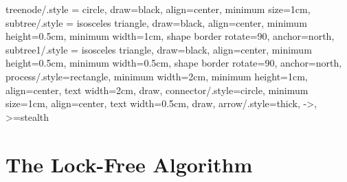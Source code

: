 \begin{limitscope}
\tikzset
{
    treenode/.style = {circle, draw=black, align=center, minimum size=1cm},
    subtree/.style  = {isosceles triangle, draw=black, align=center, minimum height=0.5cm, minimum width=1cm, shape border rotate=90, anchor=north},
    subtree1/.style  = {isosceles triangle, draw=black, align=center, minimum height=0.5cm, minimum width=0.5cm, shape border rotate=90, anchor=north},
    process/.style={rectangle, minimum width=2cm, minimum height=1cm, align=center, text width=2cm, draw},
    connector/.style={circle, minimum size=1cm, align=center, text width=0.5cm, draw},
    arrow/.style={thick, ->, >=stealth}
}
\newcommand{\terminalnode}{terminal node}
\newcommand{\targetnode}{target node}
\newcommand{\accesspath}{access-path}
\newcommand{\nullFlag}{null-flag}
\newcommand{\intentFlag}{intent-flag}
\newcommand{\deleteFlag}{delete-flag}
\newcommand{\promoteFlag}{promote-flag}
\newcommand{\anchornode}{anchor node}
\newcommand{\injection}{injection}
\newcommand{\discovery}{discovery}
\newcommand{\cleanup}{cleanup}

\newcommand{\Search}{\textsc{Search}}
\newcommand{\Insert}{\textsc{Insert}}
\newcommand{\Delete}{\textsc{Delete}}
\newcommand{\Seek}{\textsc{Seek}}
\newcommand{\FindSmallest}{\textsc{FindSmallest}}
\newcommand{\Inject}{\textsc{Inject}}
\newcommand{\FindAndMarkSuccessor}{\textsc{FindAndMarkSuccessor}}
\newcommand{\RemoveSuccessor}{\textsc{RemoveSuccessor}}
\newcommand{\Cleanup}{\textsc{Cleanup}}
\newcommand{\InitializeTypeAndUpdateMode}{\textsc{InitializeTypeAndUpdateMode}}
\newcommand{\UpdateMode}{\textsc{UpdateMode}}
\newcommand{\HelpTargetNode}{\textsc{HelpTargetNode}}
\newcommand{\HelpSuccessorNode}{\textsc{HelpSuccessorNode}}
\newcommand{\MarkChildEdge}{\textsc{MarkChildEdge}}
\newcommand{\remove}[1]{}


\newcommand{\snodeone}{\mathbb{R}}
\newcommand{\snodetwo}{\mathbb{S}}
\newcommand{\snodethree}{\mathbb{T}}
\newcommand{\skey}[1]{\infty_{#1}}


\newcommand{\myleft}{le\!f\!t}
\newcommand{\myright}{right}
\newcommand{\myparent}{parent}

\newcommand{\LL}{\textsf{LL}}
\newcommand{\SC}{\textsf{SC}}
\newcommand{\CAS}{\textsf{CAS}}

\newcommand{\true}{\textsf{true}}
\newcommand{\false}{\textsf{false}}

\section{The Lock-Free Algorithm}
\label{sec:algorithm}


\end{limitscope}
